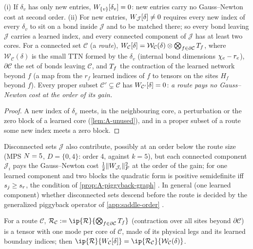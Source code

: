 \begin{lemma}[Routes]\label{lem:A-routes}
  \proven{} 
  (i) If $\delta_v$ has only new entries, $W_{\{v\}}[\delta_v]=0$: new entries carry no Gauss--Newton cost at
  second order. (ii) For new entries, $W_{\mathcal J}[\delta]\ne0$ requires every new index of every $\delta_v$ to
  sit on a bond inside $\mathcal J$ and to be matched there; so every bond leaving $\mathcal J$ carries a
  learned index, and every connected component of $\mathcal J$ has at least two cores. For a connected set
  $\mathcal C$ (a \emph{route}), $W_{\mathcal C}[\delta]=\mathcal W_{\mathcal C}(\delta)\otimes\bigotimes_{f\in\partial\mathcal C}T_{f}$,
  where $\mathcal W_{\mathcal C}(\delta)$ is the small TTN formed by the $\delta_v$ (internal bond dimensions $\chi_{e}-r_e$),
  $\partial\mathcal C$ the set of bonds leaving $\mathcal C$, and $T_{f}$ the contraction of the learned network
  beyond $f$ (a map from the $r_f$ learned indices of $f$ to tensors on the sites $H_f$ beyond $f$). Every
  proper subset $\mathcal C'\subsetneq\mathcal C$ has $W_{\mathcal C'}[\delta]=0$: \emph{a route pays no Gauss--Newton
  cost at the order of its gain.}
\end{lemma}
\begin{proof}
  A new index of $\delta_v$ meets, in the neighbouring core, a perturbation or the zero block of a learned
  core (\cref{lem:A-unused}), and in a proper subset of a route some new index meets a zero block.
\end{proof}
Disconnected sets $\mathcal J$ also contribute, possibly at an order below the route size (MPS $N=5$, $D=\{0,4\}$:
order 4, against $k=5$), but each connected component $\mathcal J_i$ pays the Gauss--Newton cost $\frac12\lVert W_{\mathcal J_i}\rVert_{F}^2$ at the
order of the gain; for one learned component and two blocks the quadratic form is positive
semidefinite iff $s_{j}\ge s_{r}$, the condition of \cref{prop:A-piggyback-graph} \derived. In general (one learned
component) whether disconnected sets descend before the route is decided by the generalized piggyback operator of
\cref{app:saddle-order} \proven.

\begin{definition}\label{def:A-local-residual}
  For a route $\mathcal C$, $\mathcal R_{\mathcal C}:=\ip{\mathcal R}{\bigotimes_{f\in\partial\mathcal C}\Sub{f}}$
  (contraction over all sites beyond $\partial\mathcal C$) is a tensor with one mode per core of
  $\mathcal C$, made of its physical legs and its learned boundary indices; then
  $\ip{\mathcal R}{\W_{\mathcal C}[\delta]}=\ip{\mathcal R_{\mathcal C}}{\mathcal W_{\mathcal C}(\delta)}$.
\end{definition}

